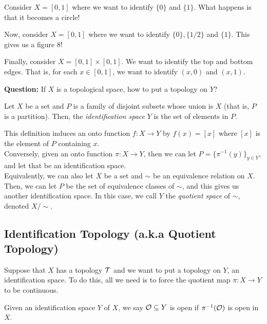 
Consider $X = [0, 1]$ where we want to identify $\{0\}$ and $\{1\}$. What happens is that it becomes a circle!

Now, consider $X = [0, 1]$ where we want to identify $\{0\}, \{1/2\}$ and $\{1\}$. This gives us a figure 8!


Finally, consider $X = [0, 1] \times [0, 1]$. We want to identify the top and bottom edges. That is, for each $x \in [0, 1]$, we want to identify $(x, 0)$ and $(x, 1)$.

\textbf{Question:} If $X$ is a topological space, how to put a topology on $Y$?

\begin{definition}
    Let $X$ be a set and $P$ is a family of disjoint subsets whose union is $X$ (that is, $P$ is a partition). Then, the \emph{identification space} $Y$ is the set of elements in $P$. \\ 
\end{definition}
This definition induces an onto function $f : X \to Y$ by $f(x) = [x]$ where $[x]$ is the element of $P$ containing $x$.\\

Conversely, given an onto function $\pi : X \to Y$, then we can let $P = \{\pi^{-1}(y)\}_{y \in Y}$, and let that be an identification space.\\

Equivalently, we can also let $X$ be a set and $\sim$ be an equivalence relation on $X$. Then, we can let $P$ be the set of equivalence classes of $\sim$, and this gives us another identification space. In this case, we call $Y$ the \emph{quotient space} of $\sim$, denoted $X / \sim$.

\subsection*{Identification Topology (a.k.a Quotient Topology)}
\sectionspace

Suppose that $X$ has a topology $\cal{T}$ and we want to put a topology on $Y$, an identification space. To do this, all we need is to force the quotient map $\pi : X \to Y$ to be continuous.\\

\begin{definition}
    Given an identification space $Y$ of $X$, we say $\cal{O} \subseteq Y$ is open if $\pi^{-1}(\cal{O})$ is open in $X$. 
\end{definition}

